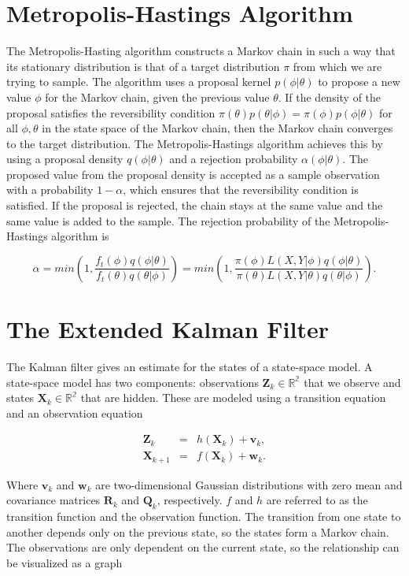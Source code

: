 \section{Metropolis-Hastings Algorithm}


The Metropolis-Hasting algorithm constructs a Markov chain in such a way that its stationary distribution is that of a target distribution $\pi$ from which we are trying to sample. The algorithm uses a proposal kernel $p(\phi | \theta)$ to propose a new value $\phi$ for the Markov chain, given the previous value $\theta$. If the density of the proposal satisfies the reversibility condition $\pi(\theta) p(\theta|\phi) = \pi(\phi) p(\phi|\theta)$ for all $\phi,\theta$ in the state space of the Markov chain, then the Markov chain converges to the target distribution. The Metropolis-Hastings algorithm achieves this by using a proposal density $q(\phi|\theta)$ and a rejection probability $\alpha(\phi|\theta)$. The proposed value from the proposal density is accepted as a sample observation with a probability $1-\alpha$, which ensures that the reversibility condition is satisfied. If the proposal is rejected, the chain stays at the same value and the same value is added to the sample. The rejection probability of the Metropolis-Hastings algorithm is

$$
    \alpha = min \left( 1, \frac{f_t(\phi)q(\phi|\theta)}{f_t(\theta)q(\theta|\phi)} \right) = min \left( 1, \frac{\pi(\phi)L(X,Y|\phi)q(\phi|\theta)}{\pi(\theta)L(X,Y|\theta)q(\theta|\phi)} \right).
$$

\parencite{gamerman2006mcmc}
\section{The Extended Kalman Filter}
\label{sec: EKF}

The Kalman filter gives an estimate for the states of a state-space model. A state-space model has two components: observations $\textbf{Z}_k\in \mathbb{R^2}$ that we observe and states $\textbf{X}_k\in \mathbb{R^2}$ that are hidden. These are modeled using a transition equation and an observation equation

$$
\begin{array}{lcl}
\textbf{Z}_k &=& h(\textbf{X}_k) + \textbf{v}_k,
\\
\textbf{X}_{k+1} &=& f(\textbf{X}_k) + \textbf{w}_k.
\end{array}
$$

 Where $\textbf{v}_k$ and $\textbf{w}_k$ are two-dimensional Gaussian distributions with zero mean and covariance matrices $\textbf{R}_k$ and $\textbf{Q}_k$, respectively. $f$ and $h$ are referred to as the transition function and the observation function. The transition from one state to another depends only on the previous state, so the states form a Markov chain. The observations are only dependent on the current state, so the relationship can be visualized as a graph

